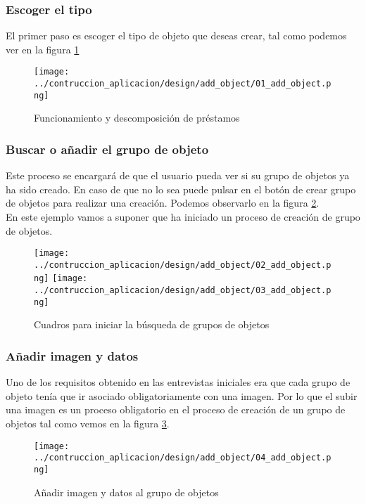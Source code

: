 \subsubsection{Escoger el tipo}
El primer paso es escoger el tipo de objeto que deseas crear, tal como podemos ver en la figura \ref{fig:1-creation-o}

\begin{figure}[h]
    \centering
    \texttt{[image: ../contruccion\_aplicacion/design/add\_object/01\_add\_object.png]}
    \caption{Funcionamiento y descomposición de préstamos}\label{fig:1-creation-o}
\end{figure}

\subsubsection{Buscar o añadir el grupo de objeto}
Este proceso se encargará de que el usuario pueda ver si su grupo de objetos ya ha sido creado. En caso de que no lo sea puede pulsar en el botón de crear grupo de objetos para realizar una creación. Podemos observarlo en la figura \ref{fig:2-creation-o}.
\\En este ejemplo vamos a suponer que ha iniciado un proceso de creación de grupo de objetos.

\begin{figure}[h]
    \centering
    \texttt{[image: ../contruccion\_aplicacion/design/add\_object/02\_add\_object.png]}
    \texttt{[image: ../contruccion\_aplicacion/design/add\_object/03\_add\_object.png]}
    \caption{Cuadros para iniciar la búsqueda de grupos de objetos}\label{fig:2-creation-o}
\end{figure}

\subsubsection{Añadir imagen y datos}
Uno de los requisitos obtenido en las entrevistas iniciales era que cada grupo de objeto tenía que ir asociado obligatoriamente con una imagen. Por lo que el subir una imagen es un proceso obligatorio en el proceso de creación de un grupo de objetos tal como vemos en la figura \ref{fig:3-creation-o}.

\begin{figure}[h]
    \centering
    \texttt{[image: ../contruccion\_aplicacion/design/add\_object/04\_add\_object.png]}
    \caption{Añadir imagen y datos al grupo de objetos}\label{fig:3-creation-o}
\end{figure}

